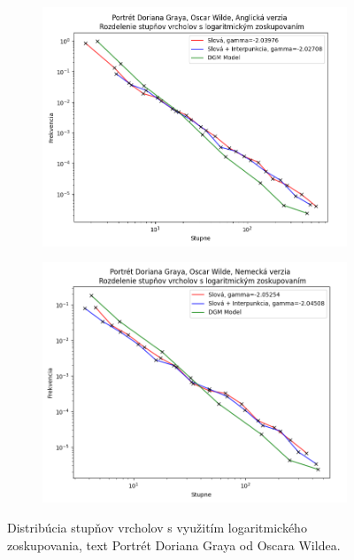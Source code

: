 \begin{figure}[htbp]
    \centering
    \begin{subfigure}[b]{0.9\textwidth}
        \includegraphics[width=\textwidth]{images/lbdegdist/Screenshot_3.png}
    \end{subfigure}

    \vspace{0.3cm}

    \begin{subfigure}[b]{0.9\textwidth}
        \includegraphics[width=\textwidth]{images/lbdegdist/Screenshot_4.png}
    \end{subfigure}
    
    \vspace{0.3cm}
    \caption{Distribúcia stupňov vrcholov s využitím logaritmického zoskupovania, text Portrét Doriana Graya od Oscara Wildea.}\label{fig:lbdegdistDorian}
\end{figure}

